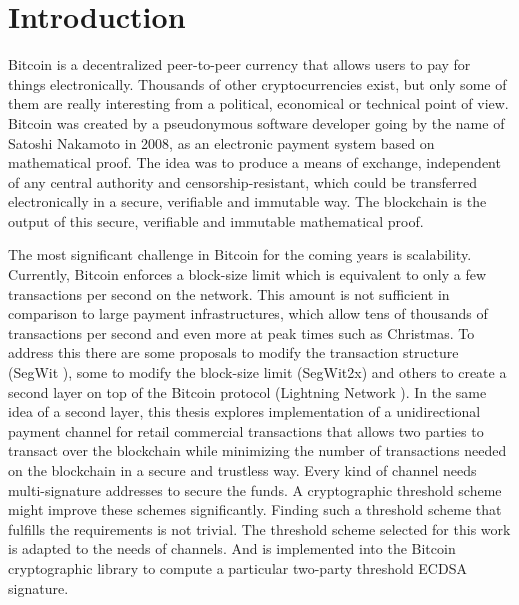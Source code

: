 \chapter{Introduction}
\label{chap:introduction}

Bitcoin is a decentralized peer-to-peer currency that allows users to pay for
things electronically. Thousands of other cryptocurrencies exist, but only some
of them are really interesting from a political, economical or technical point
of view. Bitcoin was created by a pseudonymous software developer going by the
name of Satoshi Nakamoto in 2008, as an electronic payment system based on
mathematical proof. The idea was to produce a means of exchange, independent of
any central authority and censorship-resistant, which could be transferred
electronically in a secure, verifiable and immutable way. The blockchain is the
output of this secure, verifiable and immutable mathematical proof.

The most significant challenge in Bitcoin for the coming years is scalability.
Currently, Bitcoin enforces a block-size limit which is equivalent to only a few
transactions per second on the network. This amount is not sufficient in
comparison to large payment infrastructures, which allow tens of thousands of
transactions per second and even more at peak times such as Christmas.  To
address this there are some proposals to modify the transaction structure (SegWit \cite{SegWitBIP}),
some to modify the block-size limit (SegWit2x) and others to
create a second layer on top of the Bitcoin protocol (Lightning Network \cite{poon2016bitcoin}).
In the same idea of a second layer, this thesis explores
implementation of a unidirectional payment channel for retail commercial
transactions that allows two parties to
transact over the blockchain while minimizing the number of transactions needed
on the blockchain in a secure and trustless way. Every kind of channel needs
multi-signature addresses to secure the funds. A cryptographic threshold scheme
might improve these schemes significantly. Finding such a threshold scheme that
fulfills the requirements is not trivial. The threshold scheme selected for this work is
adapted to the needs of channels. And is implemented into the Bitcoin cryptographic
library to compute a particular two-party threshold ECDSA signature.

